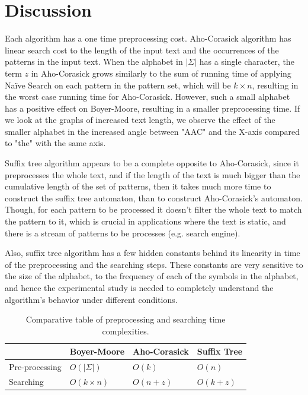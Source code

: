 \documentclass[paper=a4, fontsize=11pt]{scrartcl} %
\numberwithin{equation}{section} %
\numberwithin{figure}{section} %
\numberwithin{table}{section} %
\begin{document}
\section{Discussion}
Each algorithm has a one time preprocessing cost. Aho-Corasick algorithm has linear search cost to the length of the input text and the occurrences of the patterns in the input text. When the alphabet in $|\Sigma|$ has a single character, the term $z$ in Aho-Corasick grows similarly to the sum of running time of applying Na\"ive Search on each pattern in the pattern set, which will be $k\times n$, resulting in the worst case running time for Aho-Corasick. However, such a small alphabet has a positive effect on Boyer-Moore, resulting in a smaller preprocessing time. If we look at the graphs of increased text length, we observe the effect of the smaller alphabet in the increased angle between "AAC" and the X-axis compared to "the" with the same axis.

Suffix tree algorithm appears to be a complete opposite to Aho-Corasick, since it preprocesses the whole text, and if the length of the text is much bigger than the cumulative length of the set of patterns, then it takes much more time to construct the suffix tree automaton, than to construct Aho-Corasick's automaton. Though, for each pattern to be processed it doesn't filter the whole text to match the pattern to it, which is crucial in applications where the text is static, and there is a stream of patterns to be processes (e.g. search engine).

Also, suffix tree algorithm has a few hidden constants behind its linearity in time of the preprocessing and the searching steps. These constants are very sensitive to the size of the alphabet, to the frequency of each of the symbols in the alphabet, and hence the experimental study is needed to completely understand the algorithm's behavior under different conditions.

\begin{table}[h!]
\centering
\begin{tabular}{| l | l | l | l |}
	\hline
	& Boyer-Moore & Aho-Corasick & Suffix Tree \\
	\hline
	Pre-processing & $O(|\Sigma|)$ & $O(k)$ & $O(n)$ \\
	\hline
	Searching & $O(k\times n)$ & $O(n + z)$ & $O(k + z)$ \\
	\hline
\end{tabular}
\caption{Comparative table of preprocessing and searching time complexities.}
\end{table}


\newpage

\end{document}
